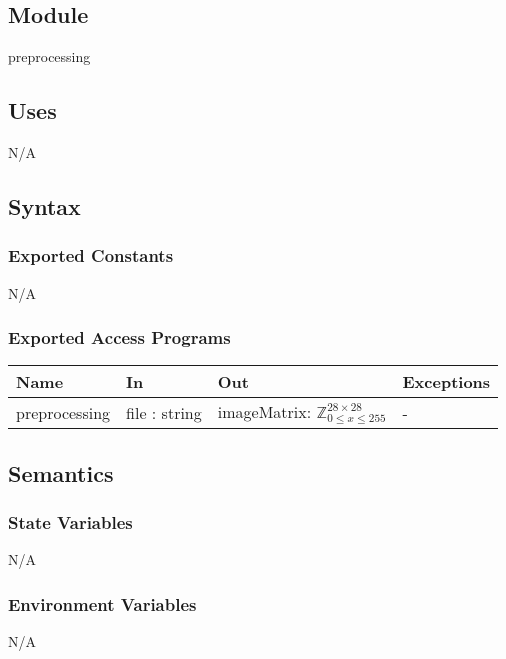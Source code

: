 \documentclass[12pt, titlepage]{article}
\begin{document}
\subsection{Module}

preprocessing

\subsection{Uses}

N/A

\subsection{Syntax}

\subsubsection{Exported Constants}

N/A

\subsubsection{Exported Access Programs}

\begin{center}
\begin{tabular}{p{3cm} p{3cm} p{4cm} p{2cm}}
\hline
\textbf{Name} & \textbf{In} & \textbf{Out} & \textbf{Exceptions} \\
\hline
preprocessing & file : string & imageMatrix: $\mathbb{Z}^{28 \times 28}_{0 \le x \le 255}$ & - \\
\hline
\end{tabular}
\end{center}

\subsection{Semantics}

\subsubsection{State Variables}

N/A

\subsubsection{Environment Variables}

N/A
\end{document}
